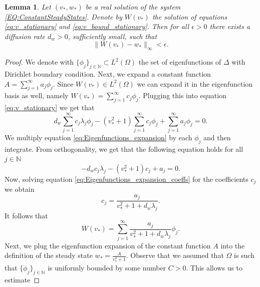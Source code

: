 \documentclass[11pt, a4paper]{article}
\theoremstyle{break}
\theoremstyle{break}
\theoremstyle{break}
\theoremstyle{break}
\theoremstyle{break}
\newtheorem{lem}{Lemma}[section]
\theoremstyle{break}
\theoremstyle{break}
\theoremstyle{break}
\theoremstyle{break}
\theoremstyle{break}
\begin{document}
\begin{lem}
    \label{lem:stationary_v_estimate_v_star}
    Let $(v_*, w_*)$ be a real solution of the system \eqref{EQ:ConstantSteadyStates}. Denote by $W(v_*)$ the solution of equations \eqref{eq:v_stationary} and \eqref{eq:v_bound_stationary}. Then for all $\epsilon > 0$ there exists a diffusion rate $d_w > 0$, sufficiently small, such that
    \begin{equation*}
        \| W(v_*) - w_*\|_\infty < \epsilon.
    \end{equation*}
\end{lem}

\begin{proof}
    We denote with $\{\phi_j\}_{j \in \mathbb{N}} \subset L^2(\Omega)$ the set of eigenfunctions of $\Delta$ with Dirichlet boundary condition. Next, 
    we expand a constant function $A = \sum_{j=1}^\infty a_j \phi_j$. Since $W(v_*) \in L^2(\Omega)$ we can expand it in the eigenfunction basis as well, namely $W(v_*) = \sum_{j=1}^\infty c_j \phi_j$. Plugging this into equation \eqref{eq:v_stationary} we get that
    \begin{equation}
        \label{eq:Eigenfunctions_expansion}
        d_w\sum_{j=1}^\infty c_j \lambda_j \phi_j - (v_*^2 + 1) \sum_{j=1}^\infty c_j \phi_j + \sum_{j=1}^\infty a_j \phi_j = 0.
    \end{equation}
    We multiply equation \eqref{eq:Eigenfunctions_expansion} by each $\phi_j$ and then integrate. From orthogonality, we get that the following equation holds for all $j \in \mathbb{N}$
    \begin{equation}
        \label{eq:Eigenfunctions_expansion_coeffs}
        -d_w c_j\lambda_j - (v_*^2+1) c_j + a_j = 0.
    \end{equation}
    Now, solving equation \eqref{eq:Eigenfunctions_expansion_coeffs} for the coefficients $c_j$ we obtain
    \begin{equation*}
        c_j = \frac{a_j}{v_*^2 + 1 + d_w\lambda_j}.
    \end{equation*}
    It follows that
    \begin{equation*}
        W(v_*) = \sum_{j=1}^\infty \frac{a_j}{v_*^2 + 1 + d_w\lambda_j} \phi_j.
    \end{equation*}
    Next, we plug the eigenfunction expansion of the constant function $A$ into the definition of the steady state $w_* = \frac{A}{v_*^2 + 1}$. Observe that we assumed that $\Omega$ is such that $\{\phi_j\}_{j \in \mathbb{N}}$ is uniformly bounded by some number $C > 0$. This allows us to estimate

\end{proof}
\end{document}
